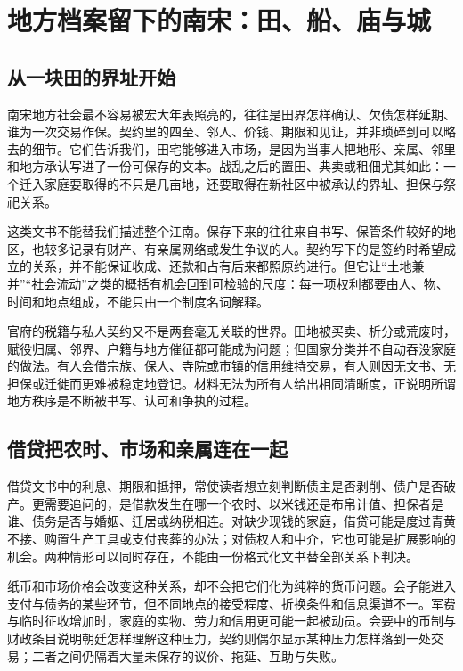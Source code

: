 \section{地方档案留下的南宋：田、船、庙与城}

\subsection{从一块田的界址开始}

南宋地方社会最不容易被宏大年表照亮的，往往是田界怎样确认、欠债怎样延期、谁为一次交易作保。契约里的四至、邻人、价钱、期限和见证，并非琐碎到可以略去的细节。它们告诉我们，田宅能够进入市场，是因为当事人把地形、亲属、邻里和地方承认写进了一份可保存的文本。战乱之后的置田、典卖或租佃尤其如此：一个迁入家庭要取得的不只是几亩地，还要取得在新社区中被承认的界址、担保与祭祀关系。

这类文书不能替我们描述整个江南。保存下来的往往来自书写、保管条件较好的地区，也较多记录有财产、有亲属网络或发生争议的人。契约写下的是签约时希望成立的关系，并不能保证收成、还款和占有后来都照原约进行。但它让“土地兼并”“社会流动”之类的概括有机会回到可检验的尺度：每一项权利都要由人、物、时间和地点组成，不能只由一个制度名词解释。

官府的税籍与私人契约又不是两套毫无关联的世界。田地被买卖、析分或荒废时，赋役归属、邻界、户籍与地方催征都可能成为问题；但国家分类并不自动吞没家庭的做法。有人会借宗族、保人、寺院或市镇的信用维持交易，有人则因无文书、无担保或迁徙而更难被稳定地登记。材料无法为所有人给出相同清晰度，正说明所谓地方秩序是不断被书写、认可和争执的过程。

\subsection{借贷把农时、市场和亲属连在一起}

借贷文书中的利息、期限和抵押，常使读者想立刻判断债主是否剥削、债户是否破产。更需要追问的，是借款发生在哪一个农时、以米钱还是布帛计值、担保者是谁、债务是否与婚姻、迁居或纳税相连。对缺少现钱的家庭，借贷可能是度过青黄不接、购置生产工具或支付丧葬的办法；对债权人和中介，它也可能是扩展影响的机会。两种情形可以同时存在，不能由一份格式化文书替全部关系下判决。

纸币和市场价格会改变这种关系，却不会把它们化为纯粹的货币问题。会子能进入支付与债务的某些环节，但不同地点的接受程度、折换条件和信息渠道不一。军费与临时征收增加时，家庭的实物、劳力和信用更可能一起被动员。会要中的币制与财政条目说明朝廷怎样理解这种压力，契约则偶尔显示某种压力怎样落到一处交易；二者之间仍隔着大量未保存的议价、拖延、互助与失败。

